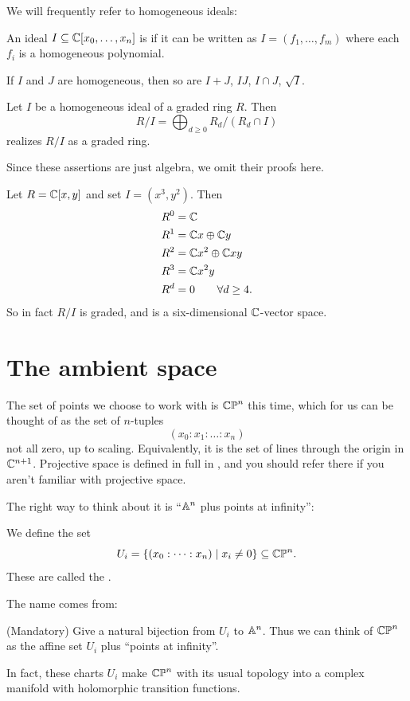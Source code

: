 We will frequently refer to homogeneous ideals:
\begin{definition}
	An ideal $I \subseteq \mathbb C[x_0, \dots, x_n]$ is 
	if it can be written as $I = (f_1, \dots, f_m)$
	where each $f_i$ is a homogeneous polynomial.
\end{definition}
\begin{remark}
	If $I$ and $J$ are homogeneous,
	then so are $I+J$, $IJ$, $I \cap J$, $\sqrt I$.
\end{remark}
\begin{lemma}
	Let $I$ be a homogeneous ideal of a graded ring $R$.
	Then
	\[ R/I = \bigoplus_{d \ge 0} R_d / (R_d \cap I) \]
	realizes $R/I$ as a graded ring.
\end{lemma}
Since these assertions are just algebra,
we omit their proofs here.
\begin{example}
	Let $R = \mathbb C[x,y]$ and set $I = (x^3, y^2)$. Then
	\begin{align*}
		R^0 &= \mathbb C \\
		R^1 &= \mathbb C x \oplus \mathbb C y \\
		R^2 &= \mathbb C x^2 \oplus \mathbb C xy \\
		R^3 &= \mathbb C x^2y \\
		R^d &= 0 \qquad \forall d \ge 4.
	\end{align*}
	So in fact $R/I$ is graded, and is a six-dimensional $\mathbb C$-vector space.
\end{example}


\section{The ambient space}
The set of points we choose to work with is $\mathbb{CP}^n$ this time,
which for us can be thought of as the set of $n$-tuples
\[ \left( x_0 : x_1 : \dots : x_n \right) \]
not all zero, up to scaling.
Equivalently, it is the set of lines through the origin in $\mathbb C^{n+1}$.
Projective space is defined in full in ,
and you should refer there if you aren't familiar with projective space.

The right way to think about it is ``$\mathbb A^n$ plus points at infinity'':
\begin{definition}
	We define the set
	\[ U_i = \left\{ (x_0 : \dots : x_n) \mid x_i \neq 0  \right\}
		\subseteq \mathbb{CP}^n. \]
	These are called the .
\end{definition}
The name comes from:
\begin{exercise}
	(Mandatory)
	Give a natural bijection from $U_i$ to $\mathbb A^n$.
	Thus we can think of $\mathbb{CP}^n$ as the affine set $U_i$
	plus ``points at infinity''.
\end{exercise}
\begin{remark}
	In fact, these charts $U_i$ make $\mathbb{CP}^n$ with its usual topology
	into a complex manifold with holomorphic transition functions.
\end{remark}

